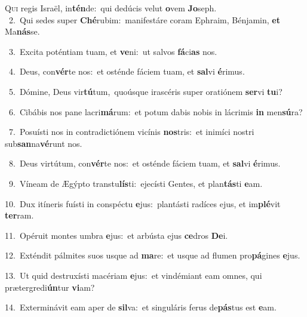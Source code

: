 \lettrine{\initial\textcolor{\initialcolor}{Q}}{ui} regis Israël, in\-\textbf{tén}\-de:~\star qui dedúcis velut \textbf{o}\-vem \textbf{Jo}\-seph.\\
{\numbfont\textcolor{\numbcolor}{~2.}}~Qui sedes super \textbf{Ché}\-rubim:~\star manifestáre coram Ephraim, Bénjamin, \textbf{et} Ma\-\textbf{nás}\-se.\par
{\numbfont\textcolor{\numbcolor}{~3.}}~Excita poténtiam tuam, et \textbf{ve}\-ni:~\star ut salvos \textbf{fá}\-ci\textbf{as} nos.\par
{\numbfont\textcolor{\numbcolor}{~4.}}~Deus, con\-\textbf{vér}\-te nos:~\star et osténde fáciem tuam, et \textbf{sal}\-vi \textbf{é}\-rimus.\par
{\numbfont\textcolor{\numbcolor}{~5.}}~Dómine, Deus vir\-\textbf{tú}\-tum,~\star quoúsque irascéris super oratiónem \textbf{ser}\-vi \textbf{tu}\-i?\par
{\numbfont\textcolor{\numbcolor}{~6.}}~Cibábis nos pane lacri\-\textbf{má}\-rum:~\star et potum dabis nobis in lácrimis \textbf{in} men\-\textbf{sú}\-ra?\par
{\numbfont\textcolor{\numbcolor}{~7.}}~Posuísti nos in contradictiónem vicínis \textbf{nos}\-tris:~\star et inimíci nostri sub\-\textbf{san}\-na\-\textbf{vé}\-runt nos.\par
{\numbfont\textcolor{\numbcolor}{~8.}}~Deus virtútum, con\-\textbf{vér}\-te nos:~\star et osténde fáciem tuam, et \textbf{sal}\-vi \textbf{é}\-rimus.\par
{\numbfont\textcolor{\numbcolor}{~9.}}~Víneam de Ægýpto transtu\-\textbf{lís}\-ti:~\star ejecísti Gentes, et plan\-\textbf{tás}\-ti \textbf{e}\-am.\par
{\numbfont\textcolor{\numbcolor}{10.}}~Dux itíneris fuísti in conspéctu \textbf{e}\-jus:~\star plantásti radíces ejus, et im\-\textbf{plé}\-vit \textbf{ter}\-ram.\par
{\numbfont\textcolor{\numbcolor}{11.}}~Opéruit montes umbra \textbf{e}\-jus:~\star et arbústa ejus \textbf{ce}\-dros \textbf{De}\-i.\par
{\numbfont\textcolor{\numbcolor}{12.}}~Exténdit pálmites suos usque ad \textbf{ma}\-re:~\star et usque ad flumen pro\-\textbf{pá}\-gines \textbf{e}\-jus.\par
{\numbfont\textcolor{\numbcolor}{13.}}~Ut quid destruxísti macériam \textbf{e}\-jus:~\star et vindémiant eam omnes, qui prætergredi\-\textbf{ún}\-tur \textbf{vi}\-am?\par
{\numbfont\textcolor{\numbcolor}{14.}}~Exterminávit eam aper de \textbf{sil}\-va:~\star et singuláris ferus de\-\textbf{pás}\-tus est \textbf{e}\-am.\par
